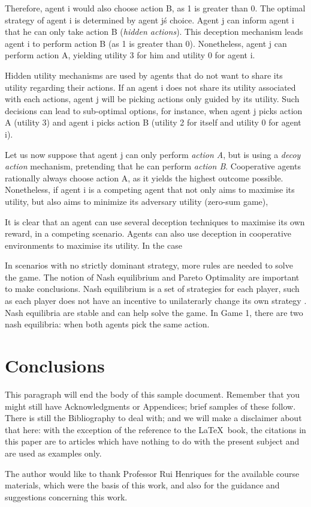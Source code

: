 Therefore, agent i would also choose action B, as 1 is greater than 0. The optimal strategy of agent i is determined by agent j\'s choice. Agent j can inform agent i that he can only take action B (\textit{hidden actions}). This deception mechanism leads agent i to perform action B (as 1 is greater than 0). Nonetheless, agent j can perform action A, yielding utility 3 for him and utility 0 for agent i. 

Hidden utility mechanisms are used by agents that do not want to share its utility regarding their actions. If an agent i does not share its utility associated with each actions, agent j will be picking actions only guided by its utility. Such decisions can lead to sub-optimal options, for instance, when agent j picks action A (utility 3) and agent i picks action B (utility 2 for itself and utility 0 for agent i). 
 
Let us now suppose that agent j can only perform \textit{action A}, but is using a \textit{decoy action} mechanism, pretending that he can perform \textit{action B}. Cooperative agents rationally always choose action A, as it yields the highest outcome possible. Nonetheless, if agent i is a competing agent that not only aims to maximise its utility, but also aims to minimize its adversary utility (zero-sum game), 

It is clear that an agent can use several deception techniques to maximise its own reward, in a competing scenario. Agents can also use deception in cooperative environments to maximise its utility. In the case 

In scenarios with no strictly dominant strategy, more rules are needed to solve the game. The notion of Nash equilibrium and Pareto Optimality are important to make conclusions. Nash equilibrium is a set of strategies for each player, such as each player does not have an incentive to unilaterarly change its own strategy \cite{rh}. Nash equilibria are stable and can help solve the game. In Game 1, there are two nash equilibria: when both agents pick the same action.

\section{Conclusions}
This paragraph will end the body of this sample document.
Remember that you might still have Acknowledgments or
Appendices; brief samples of these
follow.  There is still the Bibliography to deal with; and
we will make a disclaimer about that here: with the exception
of the reference to the \LaTeX\ book, the citations in
this paper are to articles which have nothing to
do with the present subject and are used as
examples only.




\begin{acks}
  The author would like to thank Professor Rui Henriques for the available course materials, which were the basis of this work, and also for the guidance and suggestions concerning this work. 

\end{acks}
